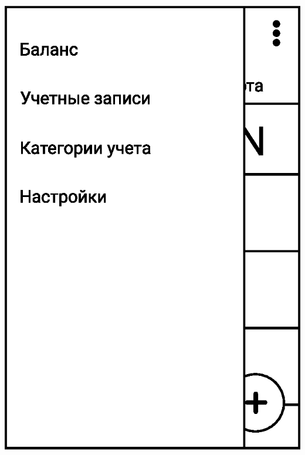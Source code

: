 \documentclass[russian,utf8,a1paper,nostitching,simple]{eskdgraph}
\begin{document}
\begin{ESKDdrawing}
  \vspace{1.7cm}
  \begin{minipage}{17cm}
    \begin{minipage}{7.5cm}
      \vspace{0.6cm}
      \centering

      \vspace{2cm}
      \centering
      \includegraphics[width=\linewidth]{fig/ui_interface_main_menu.eps}
    \end{minipage}
    \hfill
    \begin{minipage}{7.5cm}
      \centering


\end{minipage}
\end{minipage}
\end{ESKDdrawing}
\end{document}
